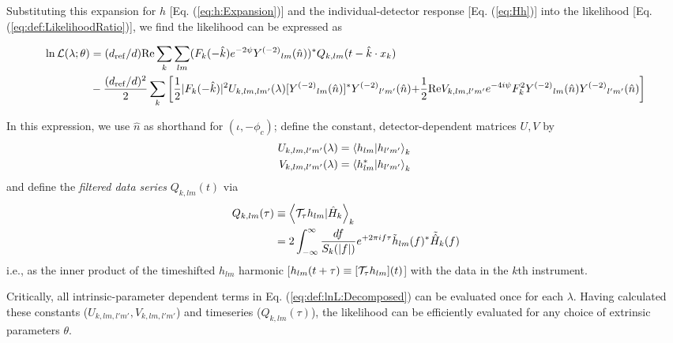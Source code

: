 Substituting this expansion for $h$ [Eq. (\ref{eq:h:Expansion})] and the individual-detector response
[Eq. (\ref{eq:Hh})] into the
likelihood [Eq. (\ref{eq:def:LikelihoodRatio})], we find the likelihood can be expressed as
\begin{widetext}
\begin{align}
\ln {\cal L}(\lambda; \theta) 
&= (d_{\rm ref}/d) \text{Re} \sum_k \sum_{lm}(F_k(-\hat{k}) e^{-2\psi} Y^{(-2)}{}_{lm}(\hat{n}))^* Q_{k,lm}(t-\hat{k}\cdot
x_k)
\nonumber \\
&   -\frac{(d_{\rm ref}/d)^2}{2}\sum_k
\left[
{
 \frac{1}{2}|F_k(-\hat{k})|^2 U_{k,lm,lm'}(\lambda)[Y^{(-2)}{}_{lm}(\hat{n})]^*Y^{(-2)}{}_{l'm'}(\hat{n})
}
 {
+
 \frac{1}{2} \text{Re} V_{k,lm,l'm'} e^{-4i\psi}F_k^2 Y^{(-2)}{}_{lm}(\hat{n})Y^{(-2)}{}_{l'm'}(\hat{n})
}
\right]
\label{eq:def:lnL:Decomposed}
\end{align}
\end{widetext}
In this expression, we use $\hat{n}$ as shorthand for $(\iota,-\phi_c)$; define the constant, detector-dependent
matrices $U,V$ by 
\begin{subequations}
\label{eq:ComputeRhoViaInnerProductMatrix}
\begin{align}
{ U_{k,lm,l'm'}(\lambda)}& = \left\langle h_{lm}|h_{l'm'}\right\rangle_k \\
V_{k,lm,l'm'}(\lambda)& = \left\langle h_{lm}^*|h_{l'm'}\right\rangle_k  \;
\end{align}
\end{subequations}
and define the \emph{filtered data series} $Q_{k,lm}(t)$ via 
\begin{align}
Q_{k,lm}(\tau) &\equiv \left\langle{\cal T}_{\tau} h_{lm}|\hat{H}_k\right\rangle_k \\
&= 2 \int_{-\infty}^{\infty} \frac{df}{S_k(|f|)} e^{+2\pi i f \tau} \tilde{h}_{lm}(f)^* \tilde{\hat{H}}_k(f) \\
\end{align}
i.e., as the inner product of the timeshifted $h_{lm}$ harmonic [$h_{lm}(t+\tau)\equiv [{\cal T}_\tau h_{lm}](t)$] with the data in the $k$th instrument.


Critically, all intrinsic-parameter dependent terms in   Eq. (\ref{eq:def:lnL:Decomposed}) can be evaluated once for
each $\lambda$.  Having calculated these constants ($U_{k,lm,l'm'},V_{k,lm,l'm'}$) and timeseries ($Q_{k,lm}(\tau)$),
the likelihood can be efficiently evaluated for any choice of extrinsic parameters $\theta$.
%


